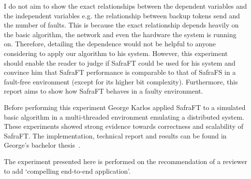 I do not aim to show the exact relationships between the dependent variables and the independent variables e.g. the relationship between backup tokens send and the number of faults.
This is because the exact relationship depends heavily on the basic algorithm, the network and even the hardware the system is running on.
Therefore, detailing the dependence would not be helpful to anyone considering to apply our algorithm to his system.
However, this experiment should enable the reader to judge if SafraFT could be used for his system and convince him that SafraFT performance is comparable to that of SafraFS in a fault-free environment (except for its higher bit complexity).
Furthermore, this report aims to show how SafraFT behaves in a faulty environment.

Before performing this experiment George Karlos applied SafraFT to a simulated basic algorithm in a multi-threaded environment emulating a distributed system.
These experiments showed strong evidence towards correctness and scalability of SafraFT.
The implementation, technical report and results can be found in George's bachelor thesis~\cite{karlos}.

The experiment presented here is performed on the recommendation of a reviewer to add `compelling end-to-end application'.
